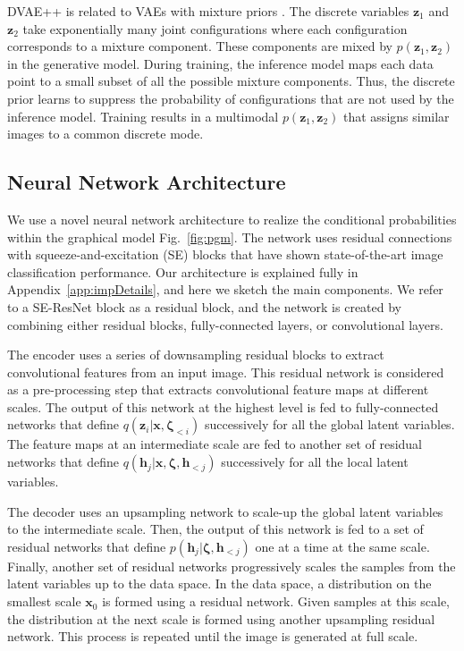 \documentclass{article}
\newcommand{\x}{{\pmb{x}}}
\newcommand{\z}{{\pmb{z}}}
\newcommand{\h}{{\pmb{h}}}
\newcommand{\bzeta}{{\pmb{\zeta}}}
\begin{document}
DVAE++ is related to VAEs with mixture priors \cite{makhzani2015adversarial, tomczak2017vae}. 
The discrete variables $\z_1$ and $\z_2$ take exponentially many joint configurations where each configuration corresponds to a mixture component. These components are mixed by $p(\z_1, \z_2)$ in the generative model. During training, the inference model maps each data
point to a small subset of all the possible mixture components. Thus, the discrete prior learns to suppress the probability of configurations
that are not used by the inference model. Training results in a multimodal $p(\z_1, \z_2)$ that assigns similar images to a common discrete mode.

\subsection{Neural Network Architecture} \label{app:nnArch}
We use a novel neural network architecture to realize the conditional probabilities within the graphical model Fig.~\ref{fig:pgm}. The network uses residual connections \cite{he2016deep} with squeeze-and-excitation (SE) blocks \cite{hu2017squeeze} 
that have shown state-of-the-art image classification performance. Our architecture is explained fully in Appendix~\ref{app:impDetails}, and here we sketch the main components. We refer to a SE-ResNet block as a residual block, and the network is created by combining either residual blocks, fully-connected layers, or convolutional layers.

The encoder uses a series of downsampling residual blocks to extract convolutional features from an input image. This residual network is considered as a pre-processing step that extracts convolutional feature maps at different scales. 
The output of this network at the highest level is fed to
fully-connected networks that define $q(\z_i | \x, \bzeta_{<i})$ successively for all the global latent variables. 
The feature maps at an intermediate scale are fed to another set of residual networks that define $q(\h_j | \x, \bzeta, \h_{<j})$ successively for all the local latent variables.

The decoder uses an upsampling network to scale-up the global latent variables to the intermediate scale. Then, the output of this network is fed to a set of residual networks that define $p(\h_j | \bzeta, \h_{<j})$ one at a time at the same scale. Finally, another set of residual networks progressively scales the samples from the latent variables up to the data space. In the data space, a distribution on the smallest scale $\x_0$ is formed using a residual network. Given samples at this scale, the distribution at the
next scale is formed using another upsampling residual network. This process is repeated until the image is generated at full scale. 
\end{document}
